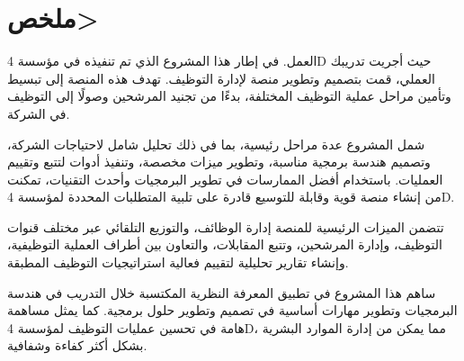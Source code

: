 \chapter*{\<ملخص>}

\hspace{0.6cm}
\begin{arabtex}
     العمل. في إطار هذا المشروع الذي تم تنفيذه في مؤسسة 4D حيث أجريت تدريبك العملي، قمت بتصميم وتطوير منصة لإدارة التوظيف. تهدف هذه المنصة إلى تبسيط وتأمين مراحل عملية التوظيف المختلفة، بدءًا من تجنيد المرشحين وصولًا إلى التوظيف في الشركة.

شمل المشروع عدة مراحل رئيسية، بما في ذلك تحليل شامل لاحتياجات الشركة، وتصميم هندسة برمجية مناسبة، وتطوير ميزات مخصصة، وتنفيذ أدوات لتتبع وتقييم العمليات. باستخدام أفضل الممارسات في تطوير البرمجيات وأحدث التقنيات، تمكنت من إنشاء منصة قوية وقابلة للتوسيع قادرة على تلبية المتطلبات المحددة لمؤسسة 4D.

تتضمن الميزات الرئيسية للمنصة إدارة الوظائف، والتوزيع التلقائي عبر مختلف قنوات التوظيف، وإدارة المرشحين، وتتبع المقابلات، والتعاون بين أطراف العملية التوظيفية، وإنشاء تقارير تحليلية لتقييم فعالية استراتيجيات التوظيف المطبقة.

ساهم هذا المشروع في تطبيق المعرفة النظرية المكتسبة خلال التدريب في هندسة البرمجيات وتطوير مهارات أساسية في تصميم وتطوير حلول برمجية. كما يمثل مساهمة هامة في تحسين عمليات التوظيف لمؤسسة 4D، مما يمكن من إدارة الموارد البشرية بشكل أكثر كفاءة وشفافية.

\end{arabtex}
